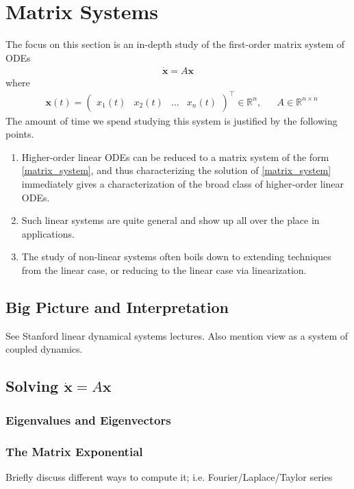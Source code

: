 \documentclass[12pt]{article}
\newcommand{\R}{\mathbb{R}}
\newcommand{\bx}{\mathbf{x}}
\begin{document}
\section{Matrix Systems}
The focus on this section is an in-depth study of the first-order matrix system of ODEs
\begin{align}
\dot{\bx} = A\bx \label{matrix_system}
\end{align}
where 
\begin{align*}
&\bx(t) = \begin{pmatrix} x_1(t) & x_2(t) & \hdots & x_n(t) \end{pmatrix}^\top \in \R^n, &&A \in \R^{n \times n}
\end{align*}
The amount of time we spend studying this system is justified by the following points. 
\begin{enumerate}
\item Higher-order linear ODEs can be reduced to a matrix system of the form \ref{matrix_system}, and thus characterizing the solution 
of \ref{matrix_system} immediately gives a characterization of the broad class of higher-order linear ODEs. 
\item Such linear systems are quite general and show up all over the place in applications. 
\item The study of non-linear systems often boils down to extending techniques from the linear case, or reducing to the 
linear case via linearization. 
\end{enumerate}

\subsection{Big Picture and Interpretation}
See Stanford linear dynamical systems lectures. Also mention view as a system of coupled dynamics. 

\subsection{Solving $\dot{\bx} = A\bx$}
\subsubsection{Eigenvalues and Eigenvectors}



\subsubsection{The Matrix Exponential}
Briefly discuss different ways to compute it; i.e. Fourier/Laplace/Taylor series
\end{document}
